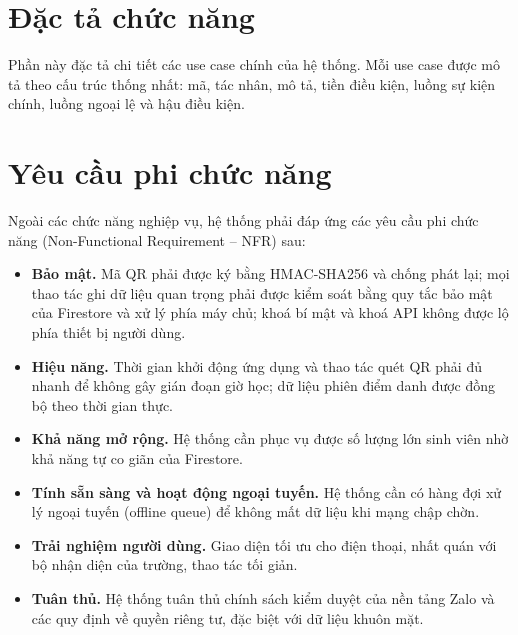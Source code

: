 \documentclass[../main.tex]{subfiles}
\begin{document}
\section{Đặc tả chức năng}
\label{sec:dac-ta}

Phần này đặc tả chi tiết các use case chính của hệ thống. Mỗi use case được mô tả theo cấu
trúc thống nhất: mã, tác nhân, mô tả, tiền điều kiện, luồng sự kiện chính, luồng ngoại lệ và
hậu điều kiện.



\section{Yêu cầu phi chức năng}
\label{sec:yeu-cau-pcn}

Ngoài các chức năng nghiệp vụ, hệ thống phải đáp ứng các yêu cầu phi chức năng
(Non-Functional Requirement -- NFR) sau:

\begin{itemize}[leftmargin=1.5em]
  \item \textbf{Bảo mật.} Mã QR phải được ký bằng HMAC-SHA256 và chống phát lại; mọi
  thao tác ghi dữ liệu quan trọng phải được kiểm soát bằng quy tắc bảo mật của Firestore
  và xử lý phía máy chủ; khoá bí mật và khoá API không được lộ phía thiết bị người dùng.

  \item \textbf{Hiệu năng.} Thời gian khởi động ứng dụng và thao tác quét QR phải đủ
  nhanh để không gây gián đoạn giờ học; dữ liệu phiên điểm danh được đồng bộ theo thời
  gian thực.

  \item \textbf{Khả năng mở rộng.} Hệ thống cần phục vụ được số lượng lớn sinh viên nhờ
  khả năng tự co giãn của Firestore.

  \item \textbf{Tính sẵn sàng và hoạt động ngoại tuyến.} Hệ thống cần có hàng đợi xử lý
  ngoại tuyến (offline queue) để không mất dữ liệu khi mạng chập chờn.

  \item \textbf{Trải nghiệm người dùng.} Giao diện tối ưu cho điện thoại, nhất quán với
  bộ nhận diện của trường, thao tác tối giản.

  \item \textbf{Tuân thủ.} Hệ thống tuân thủ chính sách kiểm duyệt của nền tảng Zalo và
  các quy định về quyền riêng tư, đặc biệt với dữ liệu khuôn mặt.
\end{itemize}
\end{document}
